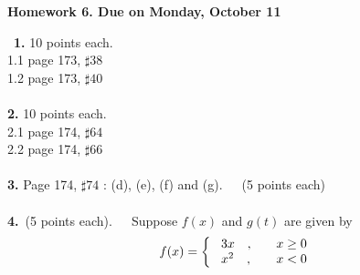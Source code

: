 \documentclass[12pt]{article}
\begin{document}
\newpage
\begin{center}
\textbf{Homework 6. Due on Monday, October 11}\\
\end{center}\
\textbf{1.} 10 points each.\\
1.1 page 173, $\sharp38$\\
1.2 page 173, $\sharp40$\\
\\
\textbf{2.} 10 points each.\\
2.1 page 174, $\sharp64$\\
2.2 page 174, $\sharp66$\\
\\
\textbf{3.} Page 174, $\sharp 74$ : (d), (e), (f) and (g).\ \ \ (5 points each)\\
\\
\textbf{4.}\ (5 points each).\ \ \ Suppose $f(x)$ and $g(t)$ are
given by
$$f(x)=\left\{ \begin{array}{ll}
              \ 3x \   \    \ ,& \   \   \  \hbox{$ x\geq 0$}
              \\
              \ x^{2}  \   \   \ , & \   \   \   \hbox{$x<0$}
                \end{array}
            \right. $$
\end{document}
